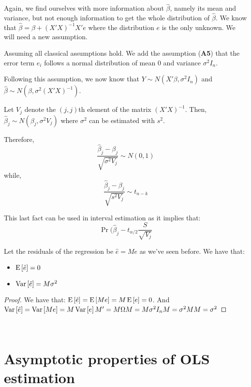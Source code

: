 Again, we find ourselves with more information about $\hat{\beta}$, namely its mean and variance, but not enough information to get the whole distribution of $\hat{\beta}$. We know that $\hat{\beta} = \beta + (X'X)^{-1}X'e$ where the distribution $e$ is the only unknown. We will need a new assumption.
\begin{definition}
Assuming all classical assumptions hold. We add the assumption (\textbf{A5}) that the error term $e_i$ follows a normal distribution of mean $0$ and variance $\sigma^2I_n$.

Following this assumption, we now know that $Y\sim N(X'\beta, \sigma^2 I_n)$ and $\hat{\beta}\sim N(\beta,\sigma^2(X'X)^{-1})$.
\end{definition}

\begin{remark}
Let $V_j$ denote the $(j,j)$th element of the matrix $(X'X)^{-1}$. Then, $\hat{\beta}_j\sim N(\beta_j, \sigma^2V_j)$ where $\sigma^2$ can be estimated with $s^2$.

Therefore, $$\frac{\hat{\beta}_j -\beta_j}{\sqrt{\sigma^2V_j}}\sim N(0,1)$$ while, $$\frac{\hat{\beta}_j -\beta_j}{\sqrt{s^2V_j}}\sim t_{n-k}$$
\end{remark}

This last fact can be used in interval estimation as it implies that: $$\operatorname{Pr}(\hat{\beta}_j - t_{\alpha /2}\frac{S}{\sqrt{V_j}} $$

\begin{remark}
Let the residuals of the regression be $\hat{e} = Me$ as we've seen before. We have that:\begin{itemize}
\item $\operatorname{E}\left[\hat{e}\right] = 0$
\item $\operatorname{Var}\left[\hat{e}\right] = M\sigma^2$
\end{itemize}
\end{remark}
\begin{proof}
We have that: $\operatorname{E}\left[\hat{e}\right] = \operatorname{E}\left[Me\right] = M\operatorname{E}\left[e\right] = 0$. And $\operatorname{Var}\left[\hat{e}\right] = \operatorname{Var}\left[Me\right] = M\operatorname{Var}\left[e\right]M' = M\Omega M = M\sigma^2I_nM = \sigma^2MM = \sigma^2$
\end{proof}

\

\section{Asymptotic properties of OLS estimation}

